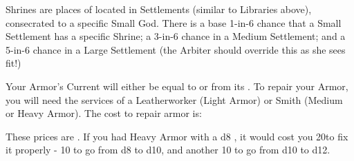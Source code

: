 
Shrines are places of  located in Settlements (similar to Libraries above), consecrated to a specific Small God. There is a base 1-in-6 chance that a Small Settlement has a specific Shrine; a 3-in-6 chance in a Medium Settlement; and a 5-in-6 chance in a Large Settlement (the Arbiter should override this as she sees fit!)



Your Armor's Current \UD will either be equal to or \DCDOWN from its \MAX. To repair your Armor, you will need the services of a Leatherworker (Light Armor) or Smith (Medium or Heavy Armor). The cost to repair armor is:


These prices are  \UD.  If you had Heavy Armor with a d8 \MAX, it would cost you 20\AU to fix it properly - 10 \AU to go from d8 to d10, and another 10 to go from d10 to d12.

